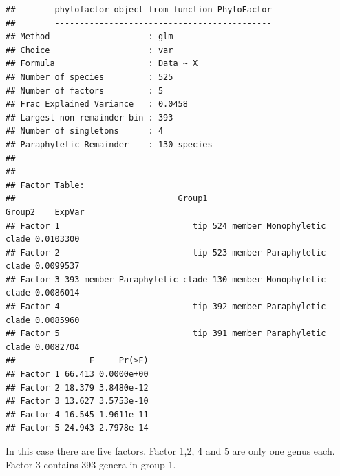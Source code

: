 \documentclass[
]{book}
\newenvironment{Shaded}{\begin{snugshade}}{\end{snugshade}}
\newcommand{\CommentTok}[1]{\textcolor[rgb]{0.56,0.35,0.01}{\textit{#1}}}
\begin{document}
\begin{verbatim}
##        phylofactor object from function PhyloFactor
##        --------------------------------------------       
## Method                    : glm
## Choice                    : var
## Formula                   : Data ~ X
## Number of species         : 525
## Number of factors         : 5
## Frac Explained Variance   : 0.0458
## Largest non-remainder bin : 393
## Number of singletons      : 4
## Paraphyletic Remainder    : 130 species
##                   
## -------------------------------------------------------------
## Factor Table:
##                                 Group1                        Group2    ExpVar
## Factor 1                           tip 524 member Monophyletic clade 0.0103300
## Factor 2                           tip 523 member Paraphyletic clade 0.0099537
## Factor 3 393 member Paraphyletic clade 130 member Monophyletic clade 0.0086014
## Factor 4                           tip 392 member Paraphyletic clade 0.0085960
## Factor 5                           tip 391 member Paraphyletic clade 0.0082704
##               F     Pr(>F)
## Factor 1 66.413 0.0000e+00
## Factor 2 18.379 3.8480e-12
## Factor 3 13.627 3.5753e-10
## Factor 4 16.545 1.9611e-11
## Factor 5 24.943 2.7978e-14
\end{verbatim}

\begin{Shaded}
\end{Shaded}

In this case there are five factors. Factor 1,2, 4 and 5 are only one genus each. Factor 3 contains 393 genera in group 1.
\end{document}
